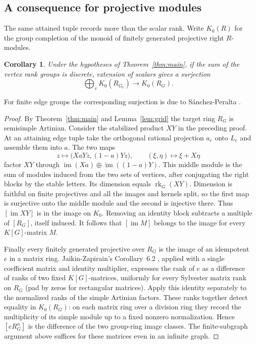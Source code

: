 \documentclass[11pt,a4paper,reqno]{amsart}
\numberwithin{equation}{section}
\newtheorem{corollary}[theorem]{Corollary}
\theoremstyle{remark}
\newcommand{\rk}{\operatorname{rk}}
\newcommand{\im}{\operatorname{im}}
\begin{document}
\subsection{A consequence for projective modules}
The same attained tuple records more than the scalar rank. Write \(K_0(R)\) for the group completion of the monoid of finitely generated projective right \(R\)-modules.
\begin{corollary}\label{cor:kzero}
Under the hypotheses of Theorem~\ref{thm:main}, if the sum of the vertex rank groups is discrete, extension of scalars gives a surjection
\[
                   \bigoplus_v K_0(R_{G_v})\longrightarrow K_0(R_G).
\]
\end{corollary}
For finite edge groups the corresponding surjection is due to S\'anchez-Peralta \cite[Theorem~1.2(iv)]{Sanchez}.
\begin{proof}
By Theorem~\ref{thm:main} and Lemma~\ref{lem:grid} the target ring \(R_G\) is semisimple Artinian. Consider the stabilized product \(XY\) in the preceding proof. At an attaining edge tuple take the orthogonal rational projection \(a_e\) onto \(L_e\) and assemble them into \(a\). The two maps
\[
 z\longmapsto\big(XaYz,(1-a)Yz\big),\qquad
 (\xi,\eta)\longmapsto \xi+X\eta
\]
factor \(XY\) through \(\im(Xa)\oplus\im((1-a)Y)\). This middle module is the sum of modules induced from the two sets of vertices, after conjugating the right blocks by the stable letters. Its dimension equals \(\rk_G(XY)\). Dimension is faithful on finite projectives and all the images and kernels split, so the first map is surjective onto the middle module and the second is injective there. Thus \([\im XY]\) is in the image on \(K_0\). Removing an identity block subtracts a multiple of \([R_G]\), itself induced. It follows that \([\im M]\) belongs to the image for every \(K[G]\)-matrix \(M\).

Finally every finitely generated projective over \(R_G\) is the image of an idempotent \(e\) in a matrix ring. Jaikin-Zapirain's Corollary~6.2 \cite{Jaikin}, applied with a single coefficient matrix and identity multiplier, expresses the rank of \(e\) as a difference of ranks of two fixed \(K[G]\)-matrices, uniformly for every Sylvester matrix rank on \(R_G\) (pad by zeros for rectangular matrices). Apply this identity separately to the normalized ranks of the simple Artinian factors. These ranks together detect equality in \(K_0(R_G)\): on each matrix ring over a division ring they record the multiplicity of its simple module up to a fixed nonzero normalization. Hence \([eR_G^n]\) is the difference of the two group-ring image classes. The finite-subgraph argument above suffices for these matrices even in an infinite graph.
\end{proof}
\end{document}
